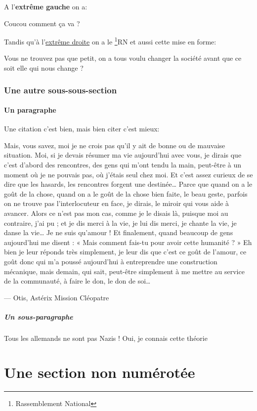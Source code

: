 A l'\textbf{extrême gauche} on a:
\begin{flushleft}
    Coucou comment ça va ?
\end{flushleft}

Tandis qu'à l'\underline{extrême droite} on a le \href{https://rassemblementnational.fr/}{\footnote{Rassemblement National}{RN}} et aussi cette mise en forme:

\begin{flushright}
    Vous ne trouvez pas que petit, on a tous voulu changer la société avant que ce soit elle qui nous change ?
\end{flushright}

\subsubsection{Une autre sous-sous-section}
\paragraph{Un paragraphe}
Une citation c'est bien, mais bien citer c'est mieux: 
\begin{quoting}
    Mais, vous savez, moi je ne crois pas qu’il y ait de bonne ou de mauvaise situation. Moi, si je devais résumer ma vie aujourd’hui avec vous, je dirais que c’est d’abord des rencontres, des gens qui m’ont tendu la main, peut-être à un moment où je ne pouvais pas, où j’étais seul chez moi. Et c’est assez curieux de se dire que les hasards, les rencontres forgent une destinée… Parce que quand on a le goût de la chose, quand on a le goût de la chose bien faite, le beau geste, parfois on ne trouve pas l’interlocuteur en face, je dirais, le miroir qui vous aide à avancer. Alors ce n’est pas mon cas, comme je le disais là, puisque moi au contraire, j’ai pu ; et je dis merci à la vie, je lui dis merci, je chante la vie, je danse la vie… Je ne suis qu’amour ! Et finalement, quand beaucoup de gens aujourd’hui me disent : « Mais comment fais-tu pour avoir cette humanité ? » Eh bien je leur réponds très simplement, je leur dis que c’est ce goût de l’amour, ce goût donc qui m’a poussé aujourd’hui à entreprendre une construction mécanique, mais demain, qui sait, peut-être simplement à me mettre au service de la communauté, à faire le don, le don de soi…
    \begin{flushright}
        --- Otis, Astérix Mission Cléopatre
    \end{flushright} 
\end{quoting}

\subparagraph{Un sous-paragraphe}

\begin{dialogue}
      Tous les allemands ne sont pas Nazis !
     Oui, je connais cette théorie
\end{dialogue}

\section*{Une section non numérotée}

